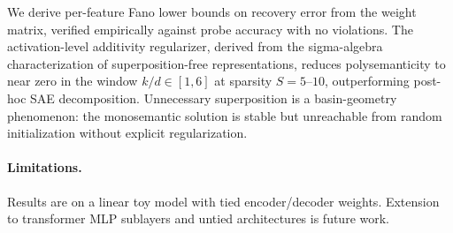 \documentclass[11pt]{article}
\begin{document}
We derive per-feature Fano lower bounds on recovery error from the weight matrix, verified
empirically against probe accuracy with no violations. The activation-level additivity
regularizer, derived from the sigma-algebra characterization of superposition-free
representations, reduces polysemanticity to near zero in the window $k/d \in [1, 6]$ at
sparsity $S = 5$--$10$, outperforming post-hoc SAE decomposition. Unnecessary superposition
is a basin-geometry phenomenon: the monosemantic solution is stable but unreachable from
random initialization without explicit regularization.

\paragraph{Limitations.} Results are on a linear toy model with tied encoder/decoder weights.
Extension to transformer MLP sublayers and untied architectures is future work.



\end{document}
